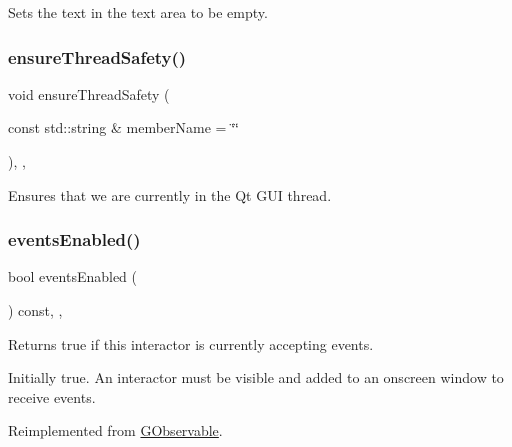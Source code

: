 Sets the text in the text area to be empty. 

\mbox{\label{classsgl_1_1GObservable_a284f31528c0520f8e545c03ac9eeac74}} 
\subsubsection{\texorpdfstring{ensure\+Thread\+Safety()}{ensureThreadSafety()}}
{\footnotesize\ttfamily void ensure\+Thread\+Safety (\begin{DoxyParamCaption}\item[{const std\+::string \&}]{member\+Name = {\ttfamily \char`\"{}\char`\"{}} }\end{DoxyParamCaption})\hspace{0.3cm}{\ttfamily [protected]}, {\ttfamily [virtual]}, {\ttfamily [inherited]}}



Ensures that we are currently in the Qt G\+UI thread. 

\mbox{\label{classsgl_1_1GInteractor_a597a370b592e3737d38d9d2f4e2031ea}} 
\subsubsection{\texorpdfstring{events\+Enabled()}{eventsEnabled()}}
{\footnotesize\ttfamily bool events\+Enabled (\begin{DoxyParamCaption}{ }\end{DoxyParamCaption}) const\hspace{0.3cm}{\ttfamily [override]}, {\ttfamily [virtual]}, {\ttfamily [inherited]}}



Returns true if this interactor is currently accepting events. 

Initially true. An interactor must be visible and added to an onscreen window to receive events. 

Reimplemented from \mbox{\hyperlink{classsgl_1_1GObservable_a8ebb3da91032e7f4c34485dabc518b8a}{G\+Observable}}.

